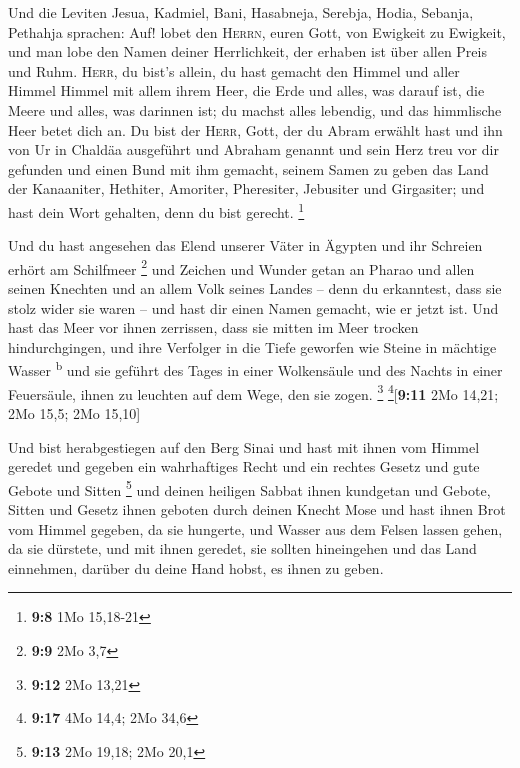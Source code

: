  Und die Leviten Jesua, Kadmiel, Bani, Hasabneja, Serebja,
Hodia, Sebanja, Pethahja sprachen: Auf! lobet den \textsc{Herrn}, euren
Gott, von Ewigkeit zu Ewigkeit, und man lobe den Namen deiner
Herrlichkeit, der erhaben ist über allen Preis und Ruhm. 
\textsc{Herr}, du bist's allein, du hast gemacht den Himmel und aller
Himmel Himmel mit allem ihrem Heer, die Erde und alles, was darauf ist,
die Meere und alles, was darinnen ist; du machst alles lebendig, und das
himmlische Heer betet dich an.  Du bist der \textsc{Herr},
Gott, der du Abram erwählt hast und ihn von Ur in Chaldäa ausgeführt und
Abraham genannt  und sein Herz treu vor dir gefunden und
einen Bund mit ihm gemacht, seinem Samen zu geben das Land der
Kanaaniter, Hethiter, Amoriter, Pheresiter, Jebusiter und Girgasiter;
und hast dein Wort gehalten, denn du bist gerecht. \footnote{\textbf{9:8}
  1Mo 15,18-21}

 Und du hast angesehen das Elend unserer Väter in Ägypten
und ihr Schreien erhört am Schilfmeer \footnote{\textbf{9:9} 2Mo 3,7}
 und Zeichen und Wunder getan an Pharao und allen seinen
Knechten und an allem Volk seines Landes -- denn du erkanntest, dass sie
stolz wider sie waren -- und hast dir einen Namen gemacht, wie er jetzt
ist.  Und hast das Meer vor ihnen zerrissen, dass sie
mitten im Meer trocken hindurchgingen, und ihre Verfolger in die Tiefe
geworfen wie Steine in mächtige Wasser \textsuperscript{b}
 und sie geführt des Tages in einer Wolkensäule und des
Nachts in einer Feuersäule, ihnen zu leuchten auf dem Wege, den sie
zogen. \footnote{\textbf{9:12} 2Mo 13,21} \footnote{\textbf{9:17} 4Mo
  14,4; 2Mo 34,6}{[}\textbf{9:11} 2Mo 14,21; 2Mo 15,5; 2Mo 15,10{]}

 Und bist herabgestiegen auf den Berg Sinai und hast mit
ihnen vom Himmel geredet und gegeben ein wahrhaftiges Recht und ein
rechtes Gesetz und gute Gebote und Sitten \footnote{\textbf{9:13} 2Mo
  19,18; 2Mo 20,1}  und deinen heiligen Sabbat ihnen
kundgetan und Gebote, Sitten und Gesetz ihnen geboten durch deinen
Knecht Mose  und hast ihnen Brot vom Himmel gegeben, da
sie hungerte, und Wasser aus dem Felsen lassen gehen, da sie dürstete,
und mit ihnen geredet, sie sollten hineingehen und das Land einnehmen,
darüber du deine Hand hobst, es ihnen zu geben.

